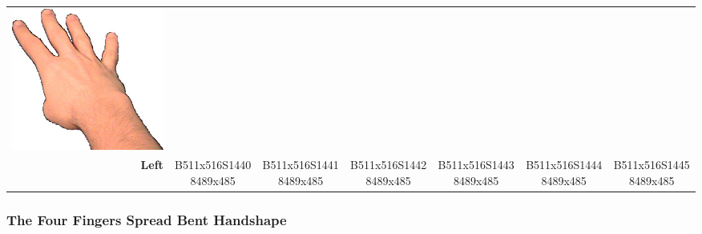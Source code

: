 \documentclass{article}
\begin{document}
\begin{center}
\begin{tabular}{r*{6}{c}}
\includegraphics[scale=0.1]{images/04-01-6.jpg}\\
\textbf{Left}&
B511x516S14408489x485&
B511x516S14418489x485&
B511x516S14428489x485&
B511x516S14438489x485&
B511x516S14448489x485&
B511x516S14458489x485\\
\end{tabular}
\end{center}

\subsubsection{The Four Fingers Spread Bent Handshape}
\end{document}
